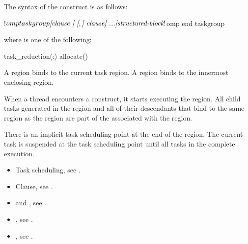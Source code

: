 \begin{fortranspecific}
The syntax of the  construct is as follows:

\begin{ompfPragma}
!$omp taskgroup \plc{[clause [ [},\plc{] clause] ...]}
    \plc{structured-block}
!$omp end taskgroup
\end{ompfPragma}

where  is one of the following:

\begin{indentedcodelist}
task_reduction(:)
allocate(\plc{[allocator: ]})
\end{indentedcodelist}

\end{fortranspecific}

\binding
A  region binds to the current task region. A  region binds to
the innermost enclosing  region.

\descr
When a thread encounters a  construct, it starts executing
the region. All child tasks generated in the  region and all
of their descendants that bind to the same  region as the
 region are part of the  associated with
the  region.

There is an implicit task scheduling point at the end of the 
region. The current task is suspended at the task scheduling point until all
tasks in the  complete execution.


\crossreferences
\begin{itemize}
\item Task scheduling, see
.
\item {} Clause, see .

\item {} and , see
.

\item {}, see
.

\item {}, see
.

\end{itemize}










